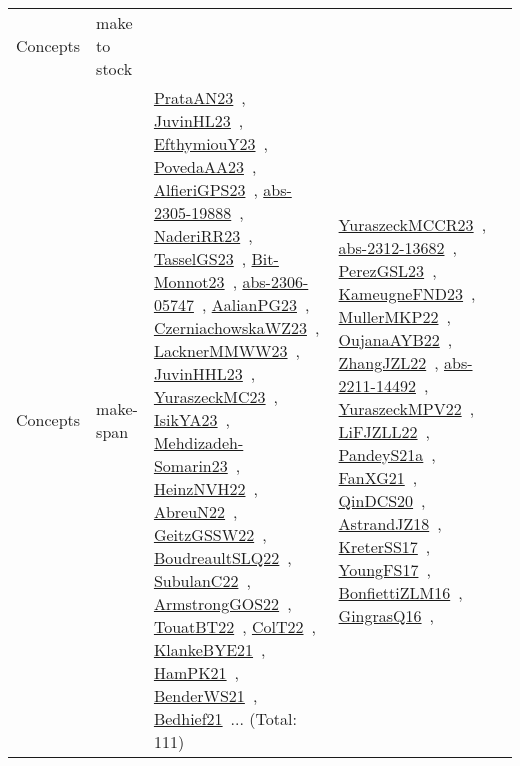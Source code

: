 {\begin{longtable}{lp{3cm}>{\raggedright\arraybackslash}p{6cm}>{\raggedright\arraybackslash}p{6cm}>{\raggedright\arraybackslash}p{8cm}}
Concepts & make to stock &  &  & \\
Concepts & make-span & \href{articles/PrataAN23.pdf}{PrataAN23}~\cite{PrataAN23}, \href{papers/JuvinHL23.pdf}{JuvinHL23}~\cite{JuvinHL23}, \href{papers/EfthymiouY23.pdf}{EfthymiouY23}~\cite{EfthymiouY23}, \href{papers/PovedaAA23.pdf}{PovedaAA23}~\cite{PovedaAA23}, \href{articles/AlfieriGPS23.pdf}{AlfieriGPS23}~\cite{AlfieriGPS23}, \href{articles/abs-2305-19888.pdf}{abs-2305-19888}~\cite{abs-2305-19888}, \href{articles/NaderiRR23.pdf}{NaderiRR23}~\cite{NaderiRR23}, \href{papers/TasselGS23.pdf}{TasselGS23}~\cite{TasselGS23}, \href{papers/Bit-Monnot23.pdf}{Bit-Monnot23}~\cite{Bit-Monnot23}, \href{articles/abs-2306-05747.pdf}{abs-2306-05747}~\cite{abs-2306-05747}, \href{papers/AalianPG23.pdf}{AalianPG23}~\cite{AalianPG23}, \href{articles/CzerniachowskaWZ23.pdf}{CzerniachowskaWZ23}~\cite{CzerniachowskaWZ23}, \href{articles/LacknerMMWW23.pdf}{LacknerMMWW23}~\cite{LacknerMMWW23}, \href{papers/JuvinHHL23.pdf}{JuvinHHL23}~\cite{JuvinHHL23}, \href{papers/YuraszeckMC23.pdf}{YuraszeckMC23}~\cite{YuraszeckMC23}, \href{articles/IsikYA23.pdf}{IsikYA23}~\cite{IsikYA23}, \href{papers/Mehdizadeh-Somarin23.pdf}{Mehdizadeh-Somarin23}~\cite{Mehdizadeh-Somarin23}, \href{articles/HeinzNVH22.pdf}{HeinzNVH22}~\cite{HeinzNVH22}, \href{articles/AbreuN22.pdf}{AbreuN22}~\cite{AbreuN22}, \href{papers/GeitzGSSW22.pdf}{GeitzGSSW22}~\cite{GeitzGSSW22}, \href{papers/BoudreaultSLQ22.pdf}{BoudreaultSLQ22}~\cite{BoudreaultSLQ22}, \href{articles/SubulanC22.pdf}{SubulanC22}~\cite{SubulanC22}, \href{papers/ArmstrongGOS22.pdf}{ArmstrongGOS22}~\cite{ArmstrongGOS22}, \href{papers/TouatBT22.pdf}{TouatBT22}~\cite{TouatBT22}, \href{articles/ColT22.pdf}{ColT22}~\cite{ColT22}, \href{papers/KlankeBYE21.pdf}{KlankeBYE21}~\cite{KlankeBYE21}, \href{articles/HamPK21.pdf}{HamPK21}~\cite{HamPK21}, \href{papers/BenderWS21.pdf}{BenderWS21}~\cite{BenderWS21}, \href{articles/Bedhief21.pdf}{Bedhief21}~\cite{Bedhief21}... (Total: 111) & \href{articles/YuraszeckMCCR23.pdf}{YuraszeckMCCR23}~\cite{YuraszeckMCCR23}, \href{articles/abs-2312-13682.pdf}{abs-2312-13682}~\cite{abs-2312-13682}, \href{papers/PerezGSL23.pdf}{PerezGSL23}~\cite{PerezGSL23}, \href{papers/KameugneFND23.pdf}{KameugneFND23}~\cite{KameugneFND23}, \href{articles/MullerMKP22.pdf}{MullerMKP22}~\cite{MullerMKP22}, \href{papers/OujanaAYB22.pdf}{OujanaAYB22}~\cite{OujanaAYB22}, \href{papers/ZhangJZL22.pdf}{ZhangJZL22}~\cite{ZhangJZL22}, \href{articles/abs-2211-14492.pdf}{abs-2211-14492}~\cite{abs-2211-14492}, \href{articles/YuraszeckMPV22.pdf}{YuraszeckMPV22}~\cite{YuraszeckMPV22}, \href{papers/LiFJZLL22.pdf}{LiFJZLL22}~\cite{LiFJZLL22}, \href{articles/PandeyS21a.pdf}{PandeyS21a}~\cite{PandeyS21a}, \href{articles/FanXG21.pdf}{FanXG21}~\cite{FanXG21}, \href{articles/QinDCS20.pdf}{QinDCS20}~\cite{QinDCS20}, \href{papers/AstrandJZ18.pdf}{AstrandJZ18}~\cite{AstrandJZ18}, \href{articles/KreterSS17.pdf}{KreterSS17}~\cite{KreterSS17}, \href{papers/YoungFS17.pdf}{YoungFS17}~\cite{YoungFS17}, \href{papers/BonfiettiZLM16.pdf}{BonfiettiZLM16}~\cite{BonfiettiZLM16}, \href{papers/GingrasQ16.pdf}{GingrasQ16}~\cite{GingrasQ16}, 
\end{longtable}}

